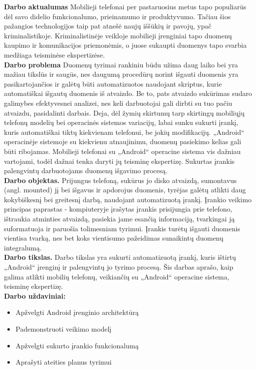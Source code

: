 \textbf{Darbo aktualumas} Mobilieji telefonai per pastaruosius metus tapo populiarūs dėl savo didelio funkcionalumo, prieinamumo ir produktyvumo. Tačiau šios pažangios technologijos taip pat atnešė naujų iššūkių ir pavojų, ypač kriminalistikoje. Kriminalistinėje veikloje mobilieji įrenginiai tapo duomenų kaupimo ir komunikacijos priemonėmis, o juose sukaupti duomenys tapo svarbia medžiaga teisminėse ekspertizėse.\\

\textbf{Darbo problema} Duomenų tyrimai rankiniu būdu užima daug laiko bei yra mažiau tikslūs ir saugūs, nes daugumą procedūrų norint išgauti duomenis yra pasikartojančios ir galėtų būti automatizuotos naudojant skriptus, kurie automatiškai išgautų duomenis iš atvaizdo. Be to, pats atvaizdo sukūrimas sudaro galimybes efektyvesnei analizei, nes keli darbuotojai gali dirbti su tuo pačiu atvaizdu, pasidalinti darbais. Deja, dėl žymių skirtumų tarp skirtingų mobiliųjų telefonų modelių bei operacinės sistemos variacijų, labai sunku sukurti įrankį, kuris automatiškai tiktų kiekvienam telefonui, be jokių modifikacijų.
„Android“ operacinėje sistemoje su kiekvienu atnaujinimu, duomenų pasiekimo kelias gali būti ribojamas. Mobilieji telefonai su „Android“ operacine sistema vis dažniau vartojami, todėl dažnai tenka daryti jų teisminę ekspertizę. Sukurtas įrankis palengvintų darbuotojams duomenų išgavimo procesą. \\

\textbf{Darbo objektas.}  Prijungus telefoną, sukūrus jo disko atvaizdą, sumontavus (angl. mounted) jį bei išgavus ir apdorojus duomenis, tyrėjas galėtų atlikti daug kokybiškesnį bei greitesnį darbą, naudojant automatizuotą įrankį. Įrankio veikimo principas paprastas - kompiuteryje įrašytas įrankis prisijungia prie telefono, ištraukia atminties atvaizdą, pasiekia jame esančią informaciją, tvarkingai ją suformatuoja ir paruošia tolimesniam tyrimui. Įrankis turėtų  išgauti duomenis vientisa tvarką, nes bet koks vientisumo pažeidimas sunaikintų duomenų integralumą.\\

\textbf{Darbo tikslas.}  Darbo tikslas yra sukurti automatizuotą įrankį, kuris ištirtų „Android“ įrenginį ir palengvintų jo tyrimo procesą. Šis darbas aprašo, kaip galima atlikti mobilių telefonų, veikiančių su „Android“ operacine sistema, teisminę ekspertizę.\\

\textbf{Darbo uždaviniai: }
\begin{itemize}
 \setlength{\itemsep}{1pt}
  \setlength{\parskip}{0pt}
  \setlength{\parsep}{0pt}
    \item  Apžvelgti Android įrenginio architektūrą
    \item  Pademonstruoti veikimo modelį
    \item  Apžvelgti sukurto įrankio funkcionalumą
    \item  Aprašyti ateities planus tyrimui
\end{itemize}
